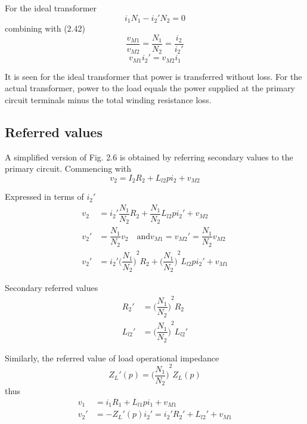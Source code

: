 \documentclass[a4paper,numbers=noenddot,12pt]{scrbook}
\begin{document}
For the ideal transformer
\begin{equation*}
    i_1 N_1 - i_2'N_2 = 0
\end{equation*}
combining with (2.42)
\begin{equation}
    \dfrac{v_{M1}}{v_{M2}} = \dfrac{N_1}{N_2} = \dfrac{i_2}{i_2'}
    \label{eq:Eq2.47}
\end{equation}
\begin{equation*}
    v_{M1} i_2' = v_{M2} i_1
\end{equation*}

It is seen for the ideal transformer that power is transferred without loss. For the actual transformer, power to the load equals the power supplied at the primary circuit terminals minus the total winding resistance loss.

\subsection{Referred values} A simplified version of Fig. 2.6 is obtained by referring secondary values to the primary circuit. Commencing with
\begin{equation*}
    v_2 = I_2 R_2 + L_{l2} p i_2 + v_{M2}
\end{equation*}

Expressed in terms of $i_2'$
\begin{align*}
    v_2 & = i_2' \dfrac{N_1}{N_2} R_2 + \dfrac{N_1}{N_2} L_{l2} p i_2' + v_{M2} \\
    v_2' & = \dfrac{N_1}{N_2} v_2 \quad \text{and} v_{M1} = v_{M2}' = \dfrac{N_1}{N_2} v_{M2} \\
    v_2' & = i_2' {\Big(\dfrac{N_1}{N_2}\Big)}^2 R_2 + {\Big(\dfrac{N_1}{N_2}\Big)}^2 L_{l2} p i_2' + v_{M1}
\end{align*}

Secondary referred values
\begin{align*}
    R_2' & = {\Big(\dfrac{N_1}{N_2}\Big)}^2 R_2 \\
    L_{l2}' & = {\Big(\dfrac{N_1}{N_2}\Big)}^2 L_{l2}'
\end{align*}

Similarly, the referred value of load operational impedance
\begin{equation*}
    Z_{L}' (p) = {\Big(\dfrac{N_1}{N_2}\Big)}^2 Z_L (p)
\end{equation*}
thus
\begin{align}
    v_1 & = i_1 R_1 + L_{l1} p i_1 + v_{M1} \nonumber \\
    v_2' & = - Z_L' (p) i_2' = i_2' R_2' + L_{l2}' + v_{M1}
    \label{eq:Eq2.48}
\end{align}
\end{document}
